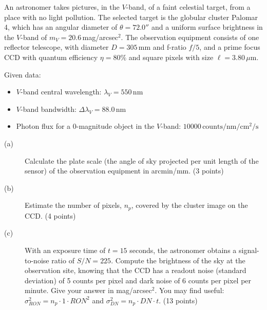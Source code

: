 An astronomer takes pictures, in the $V$-band, of a faint celestial target,
from a place with no light pollution. The selected target is the globular
cluster Palomar 4, which has an angular diameter of $\theta = 72.0''$ and a
uniform surface brightness in the $V$-band of $m_V = 20.6$\,mag/arcsec$^2$.
The observation equipment consists of one reflector telescope, with diameter
$D = 305$\,mm and f-ratio $f/5$, and a prime focus CCD with quantum
efficiency $\eta = 80\%$ and square pixels with size $\ell = 3.80\,\mu$m.

Given data:
\begin{itemize}
\item $V$-band central wavelength: $\lambda_V = 550$\,nm
\item $V$-band bandwidth: $\Delta\lambda_V = 88.0$\,nm
\item Photon flux for a 0-magnitude object in the $V$-band:
  $10000\,\mathrm{counts/nm/cm^2/s}$
\end{itemize}

\begin{description}
\item[(a)] Calculate the plate scale (the angle of sky projected per unit
  length of the sensor) of the observation equipment in arcmin/mm.
  \hfill(3 points)
\item[(b)] Estimate the number of pixels, $n_p$, covered by the cluster
  image on the CCD. \hfill(4 points)
\item[(c)] With an exposure time of $t = 15$ seconds, the astronomer obtains
  a signal-to-noise ratio of $S/N = 225$. Compute the brightness of the sky
  at the observation site, knowing that the CCD has a readout noise
  (standard deviation) of 5 counts per pixel and dark noise of 6 counts per
  pixel per minute. Give your answer in mag/arcsec$^2$. You may find useful:
  $\sigma^2_{RON} = n_p \cdot 1 \cdot RON^2$ and
  $\sigma^2_{DN} = n_p \cdot DN \cdot t$. \hfill(13 points)
\end{description}
